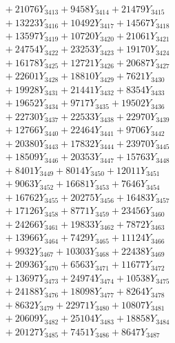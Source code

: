 \documentclass[a4paper,10pt]{article}
\begin{document}
{\begin{align}
&\;  + 21076 Y_{3413} + 9458 Y_{3414} + 21479 Y_{3415} \\[0.3ex]
&\;  + 13223 Y_{3416} + 10492 Y_{3417} + 14567 Y_{3418} \\[0.5ex]\allowbreak
&\;  + 13597 Y_{3419} + 10720 Y_{3420} + 21061 Y_{3421} \\[0.3ex]
&\;  + 24754 Y_{3422} + 23253 Y_{3423} + 19170 Y_{3424} \\[0.3ex]
&\;  + 16178 Y_{3425} + 12721 Y_{3426} + 20687 Y_{3427} \\[0.3ex]
&\;  + 22601 Y_{3428} + 18810 Y_{3429} + 7621 Y_{3430} \\[0.3ex]
&\;  + 19928 Y_{3431} + 21441 Y_{3432} + 8354 Y_{3433} \\[0.3ex]
&\;  + 19652 Y_{3434} + 9717 Y_{3435} + 19502 Y_{3436} \\[0.3ex]
&\;  + 22730 Y_{3437} + 22533 Y_{3438} + 22970 Y_{3439} \\[0.3ex]
&\;  + 12766 Y_{3440} + 22464 Y_{3441} + 9706 Y_{3442} \\[0.3ex]
&\;  + 20380 Y_{3443} + 17832 Y_{3444} + 23970 Y_{3445} \\[0.3ex]
&\;  + 18509 Y_{3446} + 20353 Y_{3447} + 15763 Y_{3448} \\[0.5ex]\allowbreak
&\;  + 8401 Y_{3449} + 8014 Y_{3450} + 12011 Y_{3451} \\[0.3ex]
&\;  + 9063 Y_{3452} + 16681 Y_{3453} + 7646 Y_{3454} \\[0.3ex]
&\;  + 16762 Y_{3455} + 20275 Y_{3456} + 16483 Y_{3457} \\[0.3ex]
&\;  + 17126 Y_{3458} + 8771 Y_{3459} + 23456 Y_{3460} \\[0.3ex]
&\;  + 24266 Y_{3461} + 19833 Y_{3462} + 7872 Y_{3463} \\[0.3ex]
&\;  + 13966 Y_{3464} + 7429 Y_{3465} + 11124 Y_{3466} \\[0.3ex]
&\;  + 9932 Y_{3467} + 10303 Y_{3468} + 22438 Y_{3469} \\[0.3ex]
&\;  + 20936 Y_{3470} + 6563 Y_{3471} + 11677 Y_{3472} \\[0.3ex]
&\;  + 13697 Y_{3473} + 24974 Y_{3474} + 10538 Y_{3475} \\[0.3ex]
&\;  + 24188 Y_{3476} + 18098 Y_{3477} + 8264 Y_{3478} \\[0.5ex]\allowbreak
&\;  + 8632 Y_{3479} + 22971 Y_{3480} + 10807 Y_{3481} \\[0.3ex]
&\;  + 20609 Y_{3482} + 25104 Y_{3483} + 18858 Y_{3484} \\[0.3ex]
&\;  + 20127 Y_{3485} + 7451 Y_{3486} + 8647 Y_{3487} \\[0.3ex]

\end{align}}
\end{document}
